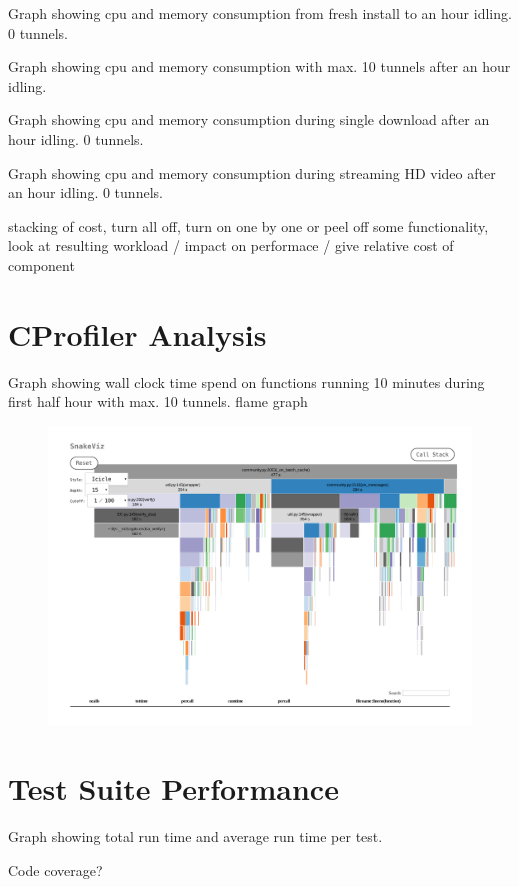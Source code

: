 Graph showing cpu and memory consumption from fresh install to an hour idling. 0 tunnels.

Graph showing cpu and memory consumption with max. 10 tunnels after an hour idling.

Graph showing cpu and memory consumption during single download after an hour idling. 0 tunnels.

Graph showing cpu and memory consumption during streaming HD video after an hour idling. 0 tunnels.



stacking of cost, turn all off, turn on one by one or peel off some functionality, look at resulting workload / impact on performace / give relative cost of component


\section{CProfiler Analysis}
Graph showing wall clock time spend on functions running 10 minutes during first half hour with max. 10 tunnels.
flame graph

\begin{figure}[h]
	\centering
	\includegraphics[width=\textwidth]{profile_1468515157}
	\caption{}
	\label{fig:profile_1468515157}
\end{figure}


\section{Test Suite Performance}
Graph showing total run time and average run time per test.

Code coverage?


